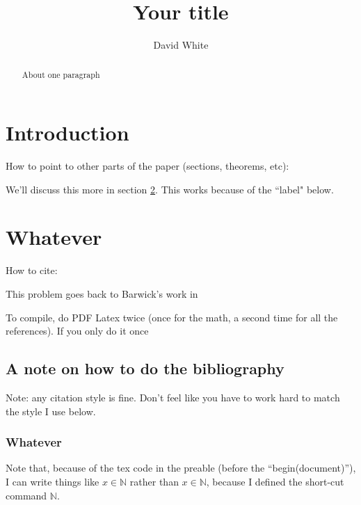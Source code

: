 \documentclass[11pt,reqno]{amsart}
\theoremstyle{definition}
\numberwithin{equation}{subsection}
\newcommand{\N}{\mathbb{N}}
\begin{document}
\title{Your title}

\author{David White}
\address{Department of Mathematics and Computer Science \\ Denison University
\\ Granville, OH}

\begin{abstract}
About one paragraph
\end{abstract}

\maketitle

\tableofcontents

\section{Introduction}

How to point to other parts of the paper (sections, theorems, etc):

We'll discuss this more in section \ref{sec:whatever}. This works because of the ``label" below.

\section{Whatever}
\label{sec:whatever}

How to cite:

This problem goes back to Barwick's work in \cite{barwickSemi}

To compile, do PDF Latex twice (once for the math, a second time for all the references). If you only do it once

\subsection{A note on how to do the bibliography}

Note: any citation style is fine. Don't feel like you have to work hard to match the style I use below.

\subsubsection{Whatever}

Note that, because of the tex code in the preable (before the ``begin(document)''), I can write things like $x \in \N$ rather than $x \in \mathbb{N}$, because I defined the short-cut command $\N$.
\end{document}
